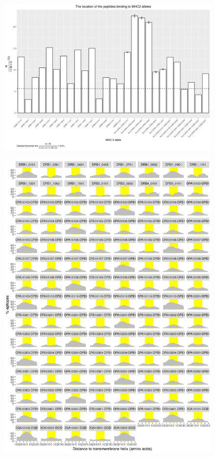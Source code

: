 \documentclass{article}
\begin{document}
	\begin{figure}[ht]
	  \includegraphics[width=\textwidth]{figure_1_5.png}
	  \label{fig:1_5}
	\end{figure}

	\begin{figure}[ht]
	  \includegraphics[width=\textwidth]{figure_3.png}
	  \label{fig:3}
	\end{figure}
\end{document}
